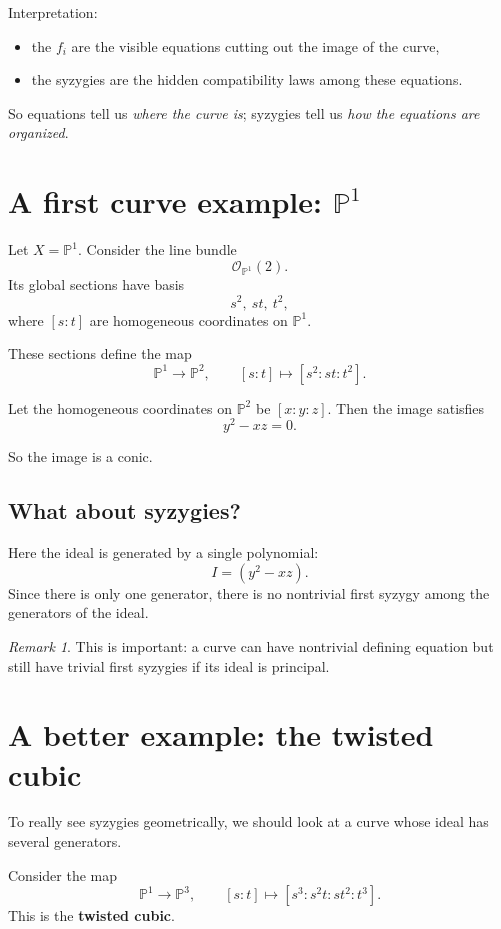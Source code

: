\documentclass[11pt]{article}
\theoremstyle{definition}
\theoremstyle{remark}
\newtheorem{remark}[theorem]{Remark}
\newcommand{\PP}{\mathbb{P}}
\newcommand{\cO}{\mathcal{O}}
\begin{document}
	Interpretation:
	
	\begin{itemize}[leftmargin=2em]
		\item the \(f_i\) are the visible equations cutting out the image of the curve,
		\item the syzygies are the hidden compatibility laws among these equations.
	\end{itemize}
	
	So equations tell us \emph{where the curve is}; syzygies tell us \emph{how the equations are organized}.
	
	\section{A first curve example: \(\PP^1\)}
	
	Let \(X=\PP^1\). Consider the line bundle
	\[
	\cO_{\PP^1}(2).
	\]
	Its global sections have basis
	\[
	s^2,\ st,\ t^2,
	\]
	where \([s:t]\) are homogeneous coordinates on \(\PP^1\).
	
	These sections define the map
	\[
	\PP^1\to \PP^2,\qquad
	[s:t]\mapsto [s^2:st:t^2].
	\]
	
	Let the homogeneous coordinates on \(\PP^2\) be \([x:y:z]\). Then the image satisfies
	\[
	y^2-xz=0.
	\]
	
	So the image is a conic.
	
	\subsection{What about syzygies?}
	
	Here the ideal is generated by a single polynomial:
	\[
	I=(y^2-xz).
	\]
	Since there is only one generator, there is no nontrivial first syzygy among the generators of the ideal.
	
	\begin{remark}
		This is important: a curve can have nontrivial defining equation but still have trivial first syzygies if its ideal is principal.
	\end{remark}
	
	\section{A better example: the twisted cubic}
	
	To really see syzygies geometrically, we should look at a curve whose ideal has several generators.
	
	Consider the map
	\[
	\PP^1\to \PP^3,\qquad
	[s:t]\mapsto [s^3:s^2t:st^2:t^3].
	\]
	This is the \textbf{twisted cubic}.
	
\end{document}
